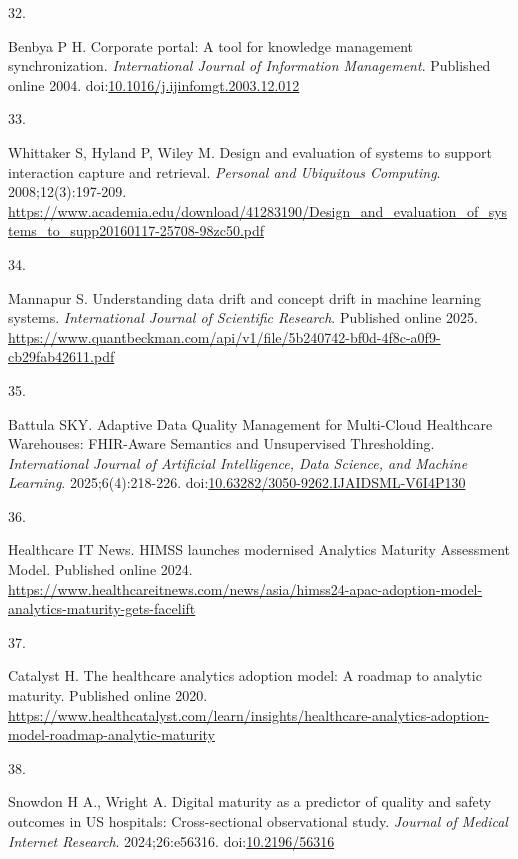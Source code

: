\documentclass[
  american,
  11pt,
  letterpaper,
  oneside  ,captions=tableheading
]{scrartcl}
\newlength{\cslhangindent}
\newlength{\csllabelwidth}
\newenvironment{CSLReferences}[2] %
 {\begin{list}{}{%
  \setlength{\itemindent}{0pt}
  \setlength{\leftmargin}{0pt}
  \setlength{\parsep}{0pt}
  \ifodd #1
   \setlength{\leftmargin}{\cslhangindent}
   \setlength{\itemindent}{-1\cslhangindent}
  \fi
  \setlength{\itemsep}{#2\baselineskip}}}
 {\end{list}}
\newcommand{\CSLLeftMargin}[1]{\parbox[t]{\csllabelwidth}{\strut#1\strut}}
\newcommand{\CSLRightInline}[1]{\parbox[t]{\linewidth - \csllabelwidth}{\strut#1\strut}}
\begin{document}
\begin{CSLReferences}{0}{1}
\CSLLeftMargin{32. }%
\CSLRightInline{Benbya P H. {Corporate portal: A tool for knowledge
management synchronization}. \emph{International Journal of Information
Management}. Published online 2004.
doi:\href{https://doi.org/10.1016/j.ijinfomgt.2003.12.012}{10.1016/j.ijinfomgt.2003.12.012}}

\CSLLeftMargin{33. }%
\CSLRightInline{Whittaker S, Hyland P, Wiley M. Design and evaluation of
systems to support interaction capture and retrieval. \emph{Personal and
Ubiquitous Computing}. 2008;12(3):197-209.
\url{https://www.academia.edu/download/41283190/Design_and_evaluation_of_systems_to_supp20160117-25708-98zc50.pdf}}

\CSLLeftMargin{34. }%
\CSLRightInline{Mannapur S. Understanding data drift and concept drift
in machine learning systems. \emph{International Journal of Scientific
Research}. Published online 2025.
\url{https://www.quantbeckman.com/api/v1/file/5b240742-bf0d-4f8c-a0f9-cb29fab42611.pdf}}

\CSLLeftMargin{35. }%
\CSLRightInline{Battula SKY. {Adaptive Data Quality Management for
Multi-Cloud Healthcare Warehouses: FHIR-Aware Semantics and Unsupervised
Thresholding}. \emph{International Journal of Artificial Intelligence,
Data Science, and Machine Learning}. 2025;6(4):218-226.
doi:\href{https://doi.org/10.63282/3050-9262.IJAIDSML-V6I4P130}{10.63282/3050-9262.IJAIDSML-V6I4P130}}

\CSLLeftMargin{36. }%
\CSLRightInline{Healthcare IT News. {HIMSS launches modernised Analytics
Maturity Assessment Model}. Published online 2024.
\url{https://www.healthcareitnews.com/news/asia/himss24-apac-adoption-model-analytics-maturity-gets-facelift}}

\CSLLeftMargin{37. }%
\CSLRightInline{Catalyst H. {The healthcare analytics adoption model: A
roadmap to analytic maturity}. Published online 2020.
\url{https://www.healthcatalyst.com/learn/insights/healthcare-analytics-adoption-model-roadmap-analytic-maturity}}

\CSLLeftMargin{38. }%
\CSLRightInline{Snowdon H A., Wright A. {Digital maturity as a predictor
of quality and safety outcomes in {US} hospitals: Cross-sectional
observational study}. \emph{Journal of Medical Internet Research}.
2024;26:e56316. doi:\href{https://doi.org/10.2196/56316}{10.2196/56316}}


\end{CSLReferences}
\end{document}
